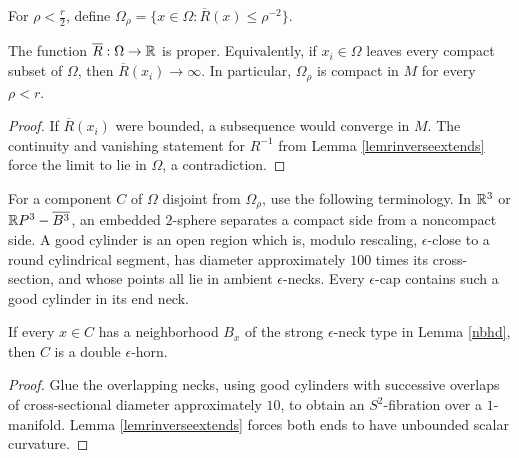 \begin{definition}
  \label{def:kl-structure-at-first-singularity-time-curvature-sublevel-regular-set}

For $\rho<\frac r2$, define
$\displaystyle\Omega_\rho=\{x\in\Omega:\overline R(x)\leq\rho^{-2}\}$.
\end{definition}

\begin{lemma}
  \label{lem:kl-structure-at-first-singularity-time-characterization-structure-at-first-singularity-time}

\label{lemoverlinerisproper}
The function $\overline R:\Omega\to{\mathbb R}$ is proper. Equivalently, if
$x_i\in\Omega$ leaves every compact subset of $\Omega$, then
$\overline R(x_i)\to\infty$. In particular, $\Omega_\rho$ is compact in $M$
for every $\rho<r$.
\end{lemma}
\begin{proof}
\sketch If $\overline R(x_i)$ were bounded, a subsequence would converge in
$M$. The continuity and vanishing statement for $R^{-1}$ from Lemma
\ref{lemrinverseextends} force the limit to lie in $\Omega$, a contradiction.
\end{proof}

For a component $C$ of $\Omega$ disjoint from $\Omega_\rho$, use the following
terminology. In ${\mathbb R}^3$ or ${\mathbb R} P^3-\overline{B^3}$, an embedded $2$-sphere
separates a compact side from a noncompact side. A good cylinder is an open
region which is, modulo rescaling, $\epsilon$-close to a round cylindrical
segment, has diameter approximately $100$ times its cross-section, and whose
points all lie in ambient $\epsilon$-necks. Every $\epsilon$-cap contains such
a good cylinder in its end neck.

\begin{lemma}
  \label{lem:kl-structure-at-first-singularity-time-neck-geometry-lemma}
 \label{doublehorn}
If every $x\in C$ has a neighborhood $B_x$ of the strong $\epsilon$-neck type
in Lemma \ref{nbhd}, then $C$ is a double $\epsilon$-horn.
\end{lemma}
\begin{proof}
\sketch Glue the overlapping necks, using good cylinders with successive
overlaps of cross-sectional diameter approximately $10$, to obtain an
$S^2$-fibration over a $1$-manifold. Lemma \ref{lemrinverseextends} forces both
ends to have unbounded scalar curvature.
\end{proof}

